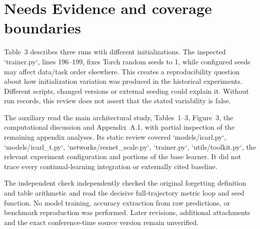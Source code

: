 \documentclass[10pt]{article}
\begin{document}
\section*{Needs Evidence and coverage boundaries}
Table 3 describes three runs with different initializations. The inspected `trainer.py`, lines 196–199, fixes Torch random seeds to 1, while configured seeds may affect data/task order elsewhere. This creates a reproducibility question about how initialization variation was produced in the historical experiments. Different scripts, changed versions or external seeding could explain it. Without run records, this review does not assert that the stated variability is false.\par
The auxiliary read the main architectural study, Tables 1–3, Figure 3, the computational discussion and Appendix A.1, with partial inspection of the remaining appendix analyses. Its static review covered `models/icarl.py`, `models/icarl\_t.py`, `networks/resnet\_scale.py`, `trainer.py`, `utils/toolkit.py`, the relevant experiment configuration and portions of the base learner. It did not trace every continual-learning integration or externally cited baseline.\par
The independent check independently checked the original forgetting definition and table arithmetic and read the decisive full-trajectory metric loop and seed function. No model training, accuracy extraction from raw predictions, or benchmark reproduction was performed. Later revisions, additional attachments and the exact conference-time source version remain unverified.\par
\end{document}
